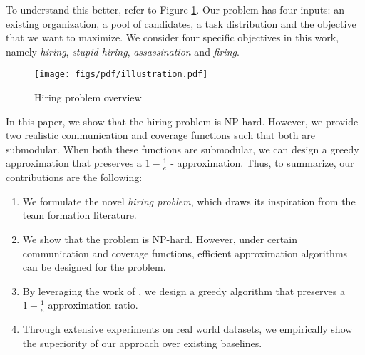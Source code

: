 To understand this better, refer to Figure \ref{fig:hpo}. Our problem has four inputs: an existing organization, a pool of candidates, a task distribution and the objective that we want to maximize. We consider four specific objectives in this work, namely \textit{hiring}, \textit{stupid hiring}, \textit{assassination} and \textit{firing}. 
 
\begin{figure}
\centering
\begin{small}
\texttt{[image: figs/pdf/illustration.pdf]}
\caption{Hiring problem overview}
\label{fig:hpo}
\end{small}
\end{figure} 

In this paper, we show that the hiring problem is NP-hard. 
However, we provide two realistic communication and coverage functions such that both are submodular.
When both these functions are submodular, we can design a greedy approximation \cite{bai2016algorithms} that preserves a $1 - \frac{1}{e}$ - approximation.
Thus, to summarize, our contributions are the following:

\begin{enumerate}
\item We formulate the novel \textit{hiring problem}, which draws its inspiration from the team formation literature.

\item We show that the problem is NP-hard. 
However, under certain communication and coverage functions, efficient approximation algorithms can be designed for the problem.

\item By leveraging the work of \cite{bai2016algorithms}, we design a greedy algorithm that preserves a $1 - \frac{1}{e}$ approximation ratio.

\item Through extensive experiments on real world datasets, we empirically show the superiority of our approach over existing baselines. 

\end{enumerate}